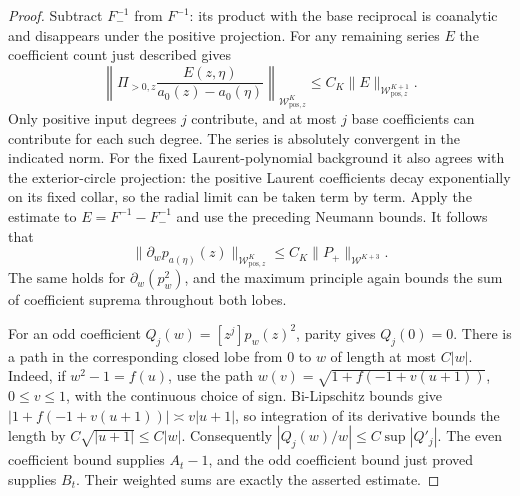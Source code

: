 \documentclass[11pt]{article}
\begin{document}
\begin{proof}
Subtract $F_-^{-1}$ from $F^{-1}$: its product with the base
reciprocal is coanalytic and disappears under the positive
projection. For any remaining series $E$ the coefficient count
just described gives
\[
 \left\|\Pi_{>0,z}
       \frac{E(z,\eta)}{a_0(z)-a_0(\eta)}
       \right\|_{\mathcal W_{\mathrm{pos},z}^K}
 \le C_K\|E\|_{\mathcal W_{\mathrm{pos},z}^{K+1}}.
\]
Only positive input degrees $j$ contribute, and at most $j$
base coefficients can contribute for each such degree. The
series is absolutely convergent in the indicated norm.
For the fixed Laurent-polynomial background it also agrees
with the exterior-circle projection: the positive Laurent
coefficients decay exponentially on its fixed collar, so the
radial limit can be taken term by term. Apply the estimate to
$E=F^{-1}-F_-^{-1}$ and use the preceding Neumann bounds. It
follows that
\[
 \|\partial_w p_{a(\eta)}(z)\|_{\mathcal W_{\mathrm{pos},z}^K}
       \le C_K\|P_+\|_{\mathcal W^{K+3}}.
\]
The same holds for $\partial_w(p_w^2)$, and the maximum principle
again bounds the sum of coefficient suprema throughout both lobes.

For an odd coefficient $Q_j(w)=[z^j]p_w(z)^2$, parity gives
$Q_j(0)=0$. There is a path in the corresponding closed lobe
from $0$ to $w$ of length at most $C|w|$. Indeed, if
$w^2-1=f(u)$, use the path
$w(v)=\sqrt{1+f(-1+v(u+1))}$, $0\le v\le1$, with the
continuous choice of sign. Bi-Lipschitz bounds give
$|1+f(-1+v(u+1))|\asymp v|u+1|$, so integration of its
derivative bounds the length by $C\sqrt{|u+1|}\le C|w|$.
Consequently $|Q_j(w)/w|\le C\sup|Q'_j|$.
The even coefficient bound supplies $A_t-1$, and the odd
coefficient bound just proved supplies $B_t$. Their weighted
sums are exactly the asserted estimate.
\end{proof}
\end{document}
